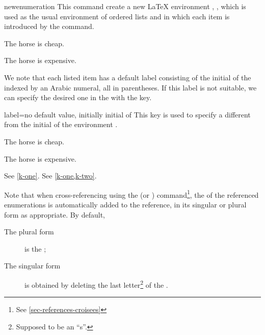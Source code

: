 \documentclass[english,nolocaltoc]{nwejmart}
\newtheorem[style=definition]{fact}
\newtheorem[title=experience]{experience}
\newtheorem[title-plural=rings]{ring}
\newtheorem[title=ideal,title-plural=ideals]{ideal}
\begin{document}
\begin{docCommand}[doc new=2019-03-18]{newenumeration}{}
  This command create a new \LaTeX{}  environment , , which
  is used as the usual  environment of
  ordered lists and in which each item is introduced by the
   command.

\begin{preamblecode}
\end{preamblecode}
\begin{bodycode}
\begin{conventions}
\item The horse is cheap.
\item The horse is expensive.
\end{conventions}
\end{bodycode}

We note that each listed item has a default label consisting of the
initial of the  indexed by an Arabic numeral, all in
parentheses. If this label is not suitable, we can specify the desired
one in  the  with the   key.
  \begin{docKey}{label}{={}}{no  default value, initially initial of }
    This key is used to specify a  different from the
    initial of the environment .
  \end{docKey}
\begin{preamblecode}
\end{preamblecode}
\begin{bodycode}[listing and text,listing options={deletekeywords={[2]label}}]
\begin{conventions}
\item\label{k-one} The horse is cheap. 
\item\label{k-two} The horse is expensive. 
\end{conventions}
See \vref{k-one}. See \vref{k-one,k-two}.
\end{bodycode}

Note that when cross-referencing using the  (or
) command\footnote{See \vref{sec-references-croisees}},
the  of the referenced enumerations is automatically added
to the reference, in its singular or plural form as appropriate. By default,
\begin{description}
\item[The plural form] is the   ;
\item[The singular form] is obtained by deleting the last
  letter\footnote{Supposed to be an \enquote{s}.} of the  .
\end{description}



\end{docCommand}
\end{document}
